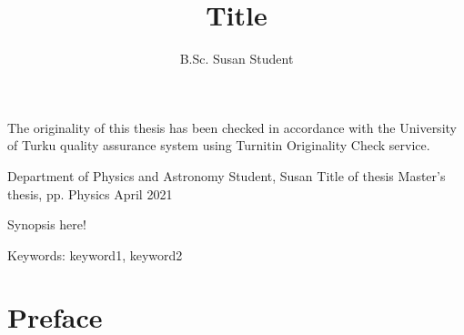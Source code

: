 
\title{Title}                   %
\author{B.Sc. Susan Student}    %
\subject{Physics}               %


\maketitle
\newpage
\thispagestyle{empty}
\vspace*{10cm}

\vfill

\hspace*{-2cm}\parbox{\textwidth}{The originality of this thesis has been checked in accordance with the University of Turku quality assurance system using Turnitin Originality Check service.} 


\newpage
\begin{synopsis}
        {Department of Physics and Astronomy}
        {Student, Susan}
        {Title of thesis}
        {Master's thesis, \pageref{LastPage} pp.}
        {Physics}
        {April 2021}
	
	Synopsis here!
	
	Keywords: keyword1, keyword2
\end{synopsis}


\tableofcontents

\newpage
{} %
\section*{Preface}


